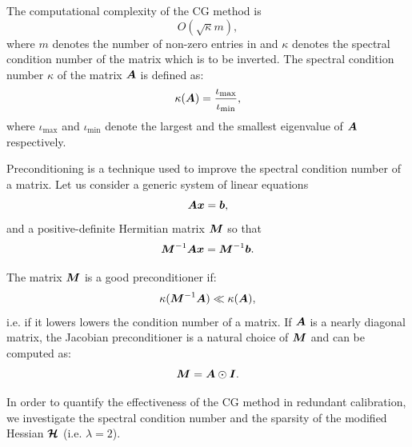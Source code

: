 \documentclass[useAMS,usenatbib]{mn2e}
\newcommand{\bA}{\bmath{A}}
\newcommand{\bM}{\bmath{M}}
\newcommand{\bI}{\bmath{I}}
\newcommand{\bb}{\bmath{b}}
\newcommand{\bx}{\bmath{x}}
\newcommand{\bmH}{\bmath{\mathcal{H}}}
\begin{document}

The computational complexity of the CG method is  
\begin{equation}
\label{eq:cg_bound}
O(\sqrt{\kappa}m), 
\end{equation}
where $m$ denotes the number of non-zero entries in and $\kappa$ denotes the spectral 
condition number of the matrix which is to be inverted. The spectral condition number $\kappa$ of the matrix $\bA$ is defined as:
\begin{equation}
\label{eq:kappa}
\kappa(\bA) = \frac{\iota_{\textrm{max}}}{\iota_{\textrm{min}}}, 
\end{equation}
where $\iota_{\textrm{max}}$ and $\iota_{\textrm{min}}$ denote the largest and the smallest eigenvalue of $\bA$ respectively.

Preconditioning is a technique used to improve the spectral condition number of a matrix. Let us consider a generic system of linear equations 
\begin{equation}
\label{eq:prec}
\bA\bx = \bb,
\end{equation}
and a positive-definite Hermitian matrix $\bM$ so that 
\begin{equation}
\label{eq:prec}
\bM^{-1}\bA\bx = \bM^{-1}\bb.
\end{equation}

The matrix $\bM$ is a good preconditioner if:
\begin{equation}
\label{eq:kappa}
\kappa(\bM^{-1}\bA) \ll \kappa(\bA),
\end{equation}
i.e. if it lowers lowers the condition number of a matrix.
If $\bA$ is a nearly diagonal matrix, the Jacobian preconditioner is a natural choice of $\bM$ and can be computed as:
\begin{equation}
\bM = \bA\odot\bI. 
\end{equation}


In order to quantify the effectiveness of the CG method in redundant calibration, we investigate the spectral condition number and the sparsity of the modified Hessian $\bmH$ (i.e. $\lambda = 2$).
\end{document}
